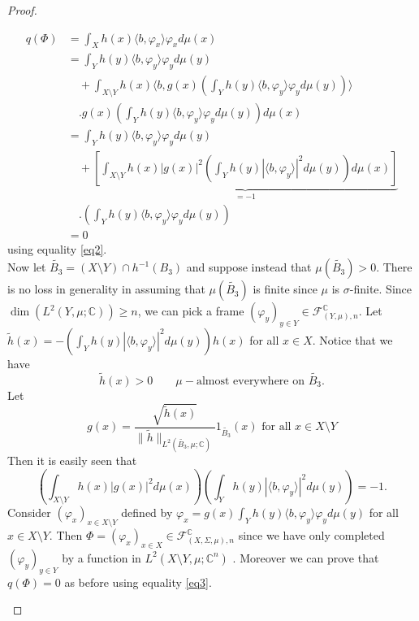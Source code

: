 \documentclass[a4paper,12pt]{article}
\theoremstyle{plain}
\theoremstyle{definition}
\theoremstyle{remark}
\begin{document}
\begin{proof}
\begin{itemize}
\begin{align*}
q(\Phi) &= \int_X h(x) \langle b , \varphi_x \rangle \varphi_x d\mu(x) \\
&= \int_Y h(y) \langle b , \varphi_y \rangle \varphi_y d\mu(y) \\ 
&\quad + \int_{X \setminus Y} h(x) \langle b , g(x)\left(\int_Y h(y) \langle b , \varphi_y \rangle \varphi_y d\mu(y) \right) \rangle \\
&\quad . g(x)\left(\int_Y h(y) \langle b , \varphi_y \rangle \varphi_y d\mu(y) \right) d\mu(x) \\
&= \int_Y h(y) \langle b , \varphi_y \rangle \varphi_y d\mu(y) \\
&\quad + \underbrace{\left[ \int_{X \setminus Y} h(x) |g(x)|^2 \left(\int_Y h(y) |\langle b , \varphi_y \rangle |^2 d\mu(y) \right) d\mu(x) \right]}_{=-1} \\
&\quad . \left(\int_Y h(y) \langle b , \varphi_y \rangle \varphi_y d\mu(y) \right) \\
&= 0
\end{align*}
using equality \ref{eq2}. \\
Now let  $\widetilde{B_3} = (X \setminus Y) \cap h^{-1}(B_3)$ and suppose instead that $\mu(\widetilde{B_3})>0$. There is no loss in generality in assuming that $\mu(\widetilde{B_3})$ is finite since $\mu$ is $\sigma$-finite.  Since $\dim(L^2(Y,\mu;\mathbb{C})) \geq n$, we can pick a frame $(\varphi_y)_{y \in Y} \in \mathcal{F}_{(Y,\mu),n}^\mathbb{C}$. Let $\widetilde{h}(x) = - \left( \int_Y h(y) |\langle b , \varphi_y \rangle|^2 d\mu(y) \right) h(x)$ for all $x \in X$. Notice that we have 
\[ \widetilde{h}(x) > 0 \qquad \mu-\text{almost everywhere on } \widetilde{B_3}. \] 
Let 
\[ g(x) = \frac{\sqrt{\widetilde{h}(x)}}{\lVert \widetilde{h} \rVert_{L^2(\widetilde{B_3},\mu;\mathbb{C})}} 1_{\widetilde{B_3}}(x) \text{ for all } x \in X \setminus Y \]
Then it is easily seen that 
\begin{equation}
\label{eq3}
\left( \int_{X \setminus Y} h(x) |g(x)|^2  d\mu(x) \right) \left(\int_Y h(y) | \langle b , \varphi_y \rangle | ^2 d\mu(y) \right) = -1. 
\end{equation}
Consider $(\varphi_x)_{x \in X \setminus Y}$ defined by $\varphi_x = g(x)\int_Y h(y) \langle b , \varphi_y \rangle \varphi_y d\mu(y)$ for all $x \in X \setminus Y$. Then $\Phi = (\varphi_x)_{x \in X} \in \mathcal{F}_{(X,\Sigma,\mu),n}^\mathbb{C}$ since we have only completed $(\varphi_y)_{y \in Y}$ by a function in $L^2(X \setminus Y,\mu;\mathbb{C}^n)$ . Moreover we can prove that $q(\Phi)=0$ as before using equality \ref{eq3}.
\end{itemize}
\end{proof}
\end{document}
